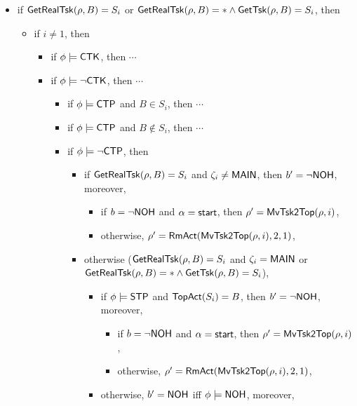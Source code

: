 %
\begin{itemize}
    \item if $\mathsf{GetRealTsk}(\rho, B) = S_i$ or $\mathsf{GetRealTsk}(\rho,B) = * \wedge\mathsf{GetTsk}(\rho,B) = S_i$, then
    \begin{itemize}
    \item if $i \neq 1$, then 
        \begin{itemize}
            \item if $\phi \models {\sf CTK}$, then $\cdots$ 
            \item if $\phi \models \neg {\sf CTK}$, then $\cdots$
                \begin{itemize}
                    \item if $\phi \models{\sf CTP}$ and $B \in S_i$, then $\cdots$
                    \item if $\phi \models{\sf CTP}$ and $B \notin S_i$, then $\cdots$
                    \item if $\phi \models\neg{\sf CTP}$, then
                    \begin{itemize}
							\item if $\mathsf{GetRealTsk}(\rho,B) = S_i$ and $\zeta_i \neq {\sf MAIN}$, then $b' = \neg {\sf NOH}$, moreover,
							\begin{itemize}
								\item if $b = \neg {\sf NOH}$ and $\alpha = {\mathsf{start} }$, then $\rho'=\mathsf{MvTsk2Top}(\rho, i)$,
								\item otherwise, $\rho' = \mathsf{RmAct}(\mathsf{MvTsk2Top}(\rho, i), 2, 1)$, 
							\end{itemize}
							\item otherwise ($\mathsf{GetRealTsk}(\rho,B) = S_i$ and $\zeta_i = {\sf MAIN}$ or $\mathsf{GetRealTsk}(\rho,B) = * \wedge\mathsf{GetTsk}(\rho,B) = S_i$), 
							\begin{itemize}
								\item if $\phi\models{\sf STP}$ and $\mathsf{TopAct}(S_i) = B$, then $b' = \neg {\sf NOH}$, moreover,
								\begin{itemize}
									\item if $b = \neg {\sf NOH}$ and $\alpha = {\mathsf{start} }$, then $\rho'=\mathsf{MvTsk2Top}(\rho, i)$,
									\item otherwise, $\rho' = \mathsf{RmAct}(\mathsf{MvTsk2Top}(\rho, i), 2, 1)$, 
								\end{itemize}
								\item otherwise, $b' = {\sf NOH}$ iff $\phi \models {\sf NOH}$, moreover, 

\end{itemize}
\end{itemize}
\end{itemize}
\end{itemize}
\end{itemize}
\end{itemize}
